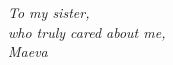 \begin{minipage}{0.8\textwidth}
    \vspace*{5cm}
    \begin{flushright}
        {
            \selectfont
            \large
            \textit{To my sister,\\who truly cared about me,\\Maeva}
        }
    \end{flushright}
    \vfill
\end{minipage}